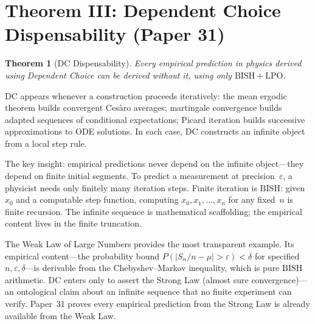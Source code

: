 \documentclass[11pt,a4paper]{report}
\theoremstyle{plain}
\newtheorem{theorem}{Theorem}[chapter]
\theoremstyle{definition}
\theoremstyle{remark}
\newcommand{\BISH}{\mathrm{BISH}}
\newcommand{\LPO}{\mathrm{LPO}}
\newcommand{\DC}{\mathrm{DC}}
\begin{document}
\section{Theorem III: Dependent Choice Dispensability (Paper 31)}

\begin{theorem}[DC Dispensability]
Every empirical prediction in physics derived using Dependent Choice can be derived without it, using only $\BISH+\LPO$.
\end{theorem}

$\DC$ appears whenever a construction proceeds iteratively: the mean ergodic theorem builds convergent Cesàro averages; martingale convergence builds adapted sequences of conditional expectations; Picard iteration builds successive approximations to ODE solutions. In each case, $\DC$ constructs an infinite object from a local step rule.

The key insight: empirical predictions never depend on the infinite object---they depend on finite initial segments. To predict a measurement at precision~$\varepsilon$, a physicist needs only finitely many iteration steps. Finite iteration is $\BISH$: given $x_0$ and a computable step function, computing $x_0, x_1, \ldots, x_n$ for any fixed~$n$ is finite recursion. The infinite sequence is mathematical scaffolding; the empirical content lives in the finite truncation.

The Weak Law of Large Numbers provides the most transparent example. Its empirical content---the probability bound $P(|S_n/n - \mu| > \varepsilon) < \delta$ for specified $n, \varepsilon, \delta$---is derivable from the Chebyshev--Markov inequality, which is pure $\BISH$ arithmetic. $\DC$ enters only to assert the Strong Law (almost sure convergence)---an ontological claim about an infinite sequence that no finite experiment can verify. Paper~31 proves every empirical prediction from the Strong Law is already available from the Weak Law.
\end{document}
